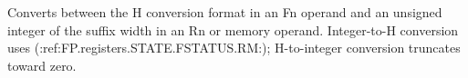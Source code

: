 Converts between the H conversion format in an Fn operand and an unsigned integer of the suffix width in an Rn or
memory operand. Integer-to-H conversion uses (:ref:FP.registers.STATE.FSTATUS.RM:); H-to-integer conversion truncates toward zero.
